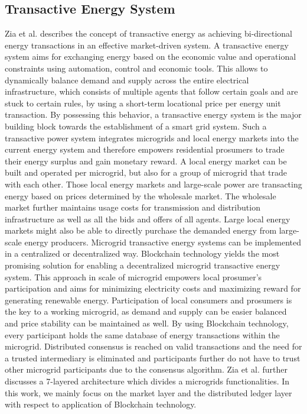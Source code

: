\documentclass[runningheads]{llncs}
\begin{document}
\subsection{Transactive Energy System}
Zia et al. \cite{zia_microgrid_te} describes the concept of transactive energy as achieving bi-directional energy transactions in an effective market-driven system. A transactive energy system aims for exchanging energy based on the economic value and operational constraints using automation, control and economic tools. This allows to dynamically balance demand and supply across the entire electrical infrastructure, which consists of multiple agents that follow certain goals and are stuck to certain rules, by using a short-term locational price per energy unit transaction. By possessing this behavior, a transactive energy system is the major building block towards the establishment of a smart grid system. \newline
Such a transactive power system integrates microgrids and local energy markets into the current energy system and therefore empowers residential prosumers to trade their energy surplus and gain monetary reward. A local energy market can be built and operated per microgrid, but also for a group of microgrid that trade with each other. Those local energy markets and large-scale power are transacting energy based on prices determined by the wholesale market. The wholesale market further maintains usage costs for transmission and distribution infrastructure as well as all the bids and offers of all agents. Large local energy markets might also be able to directly purchase the demanded energy from large-scale energy producers. \cite{zia_microgrid_te}
Microgrid transactive energy systems can be implemented in a centralized or decentralized way. Blockchain technology yields the most promising solution for enabling a decentralized microgrid transactive energy system. This approach in scale of microgrid empowers local prosumer’s participation and aims for minimizing electricity costs and maximizing reward for generating renewable energy. Participation of local consumers and prosumers is the key to a working microgrid, as demand and supply can be easier balanced and price stability can be maintained as well. By using Blockchain technology, every participant holds the same database of energy transactions within the microgrid. Distributed consensus is reached on valid transactions and the need for a trusted intermediary is eliminated and participants further do not have to trust other microgrid participants due to the consensus algorithm.
Zia et al. \cite{zia_microgrid_te} further discusses a 7-layered architecture which divides a microgrids functionalities. In this work, we mainly focus on the market layer and the distributed ledger layer with respect to application of Blockchain technology.
\end{document}
